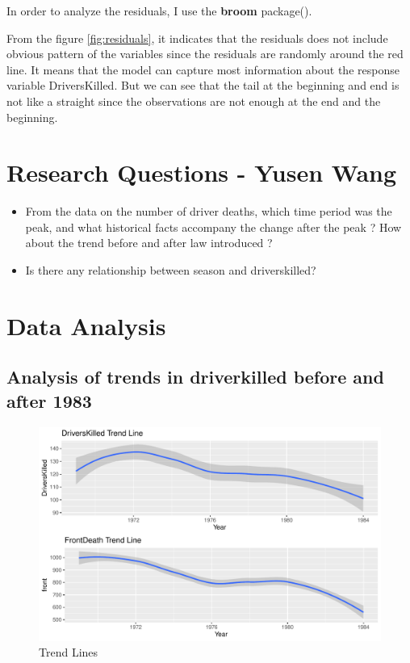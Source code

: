 \documentclass[11pt,a4paper,]{article}
\begin{document}
In order to analyze the residuals, I use the \textbf{broom} package(\cite{11}).

From the figure \ref{fig:residuals}, it indicates that the residuals does not include obvious pattern of the variables since the residuals are randomly around the red line. It means that the model can capture most information about the response variable DriversKilled. But we can see that the tail at the beginning and end is not like a straight since the observations are not enough at the end and the beginning.

\hypertarget{research-questions---yusen-wang}{%
\section{Research Questions - Yusen Wang}\label{research-questions---yusen-wang}}

\begin{itemize}
\item
  From the data on the number of driver deaths, which time period was the peak, and what historical facts accompany the change after the peak ? How about the trend before and after law introduced ?
\item
  Is there any relationship between season and driverskilled?
\end{itemize}

\hypertarget{data-analysis}{%
\section{Data Analysis}\label{data-analysis}}

\hypertarget{analysis-of-trends-in-driverkilled-before-and-after-1983}{%
\subsection{Analysis of trends in driverkilled before and after 1983}\label{analysis-of-trends-in-driverkilled-before-and-after-1983}}

\begin{figure}
\centering
\includegraphics{report_files/figure-latex/figureE-1.pdf}
\caption{\label{fig:figureE}Trend Lines}
\end{figure}
\end{document}
